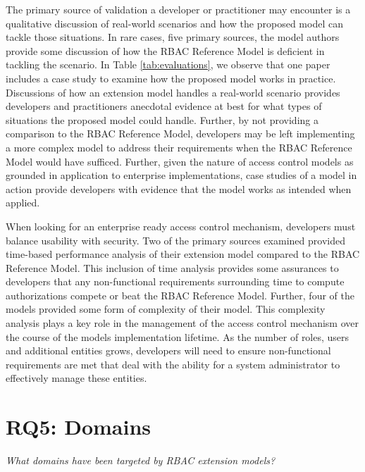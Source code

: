 The primary source of validation a developer or practitioner may encounter is a qualitative discussion of real-world
scenarios and how the proposed model can tackle those situations. In rare cases, five primary sources, the model 
authors provide some discussion of how the RBAC Reference Model is deficient in tackling the scenario.
In Table \ref{tab:evaluations}, we observe that one paper includes a case study to examine how the proposed model works in practice. Discussions
of how an extension model handles a real-world scenario provides developers and practitioners anecdotal evidence at best
for what types of situations the proposed model could handle. Further, by not providing a comparison to the RBAC Reference Model, developers may be left implementing a more complex model to address their requirements when the RBAC Reference Model would
have sufficed.  Further, given the nature of access control models as grounded in application to enterprise implementations, 
case studies of a model in action provide developers with evidence that the model works as intended when applied.

When looking for an enterprise ready access control mechanism, developers must balance usability with security. 
Two of the primary sources examined provided time-based performance analysis of their extension model compared
to the RBAC Reference Model. This inclusion of time analysis provides some assurances to developers that any non-functional
requirements surrounding time to compute authorizations compete or beat the RBAC Reference Model. Further, four of the models provided
some form of complexity of their model. This complexity analysis plays a key role in the management of the access control mechanism
over the course of the models implementation lifetime. As the number of roles, users and additional entities grows, developers will 
need to ensure non-functional requirements are met that deal with the ability for a system administrator to effectively manage these
entities.



\section{RQ5: Domains} \label{sec:domains}

\textit{What domains have been targeted by RBAC extension models?}
\\

